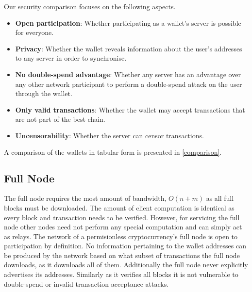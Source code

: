 Our security comparison focuses on the following aspects.
\begin{itemize}
    \item \textbf{Open participation}: Whether participating as a wallet's server is possible for everyone.
    \item \textbf{Privacy}: Whether the wallet reveals information about the user's addresses to any server in order to synchronise.
    \item \textbf{No double-spend advantage}: Whether any server has an advantage over any other network participant to perform a double-spend attack on the user through the wallet.
    \item \textbf{Only valid transactions}: Whether the wallet may accept transactions that are not part of the best chain.
    \item \textbf{Uncensorability}: Whether the server can censor transactions.
\end{itemize}

A comparison of the wallets in tabular form is presented in \cref{comparison}.

\subsection{Full Node}
The full node requires the most amount of bandwidth, $O(n+m)$ as all full blocks must be downloaded. The amount of client computation is identical as every block and transaction needs to be verified. However, for servicing the full node other nodes need not perform any special computation and can simply act as relays. The network of a permisionless cryptocurrency's full node is open to participation by definition. No information pertaining to the wallet addresses can be produced by the network based on what subset of transactions the full node downloads, as it downloads all of them. Additionally the full node never explicitly advertises its addresses. Similarly as it verifies all blocks it is not vulnerable to double-spend or invalid transaction acceptance attacks.

